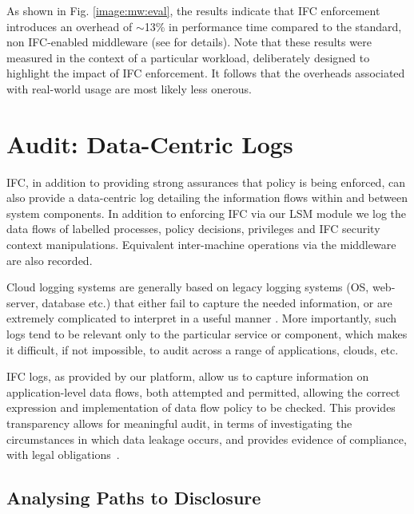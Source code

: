 \documentclass[10pt,journal,compsoc]{IEEEtran}
\begin{document}
As shown in Fig. \ref{image:mw:eval},
the results indicate that IFC enforcement introduces an overhead of  $\sim$13\% in performance time compared to the standard, non IFC-enabled middleware (see \cite{singh2014ic2e} for details).
Note that these results were measured in the context of a particular workload, deliberately designed to highlight the impact of IFC enforcement. It follows that the overheads associated with real-world usage are most likely less onerous. 





 
\section{Audit: Data-Centric Logs}
\label{sec:audit}




IFC, in addition to providing strong assurances that policy is being enforced, can also provide a data-centric log \cite{Ganjali:2012:ACM:2382536.2382549} detailing the information flows within and between system components. 
In addition to enforcing IFC via our LSM module we log the data flows of labelled processes, policy decisions, privileges and IFC security context manipulations.
Equivalent inter-machine operations via the middleware are also recorded.


Cloud logging systems are generally based on legacy logging systems (OS, web-server, database etc.) that either fail to capture the needed information, or are extremely complicated to interpret in a useful manner \cite{ko2011system}. More importantly, such logs tend to be relevant only to the particular service or component, which makes it difficult, if not impossible, to audit across a range of applications, clouds, etc.

IFC logs, as provided by our platform, allow us to capture information on application-level data flows, both attempted and permitted, allowing the correct expression and implementation of data flow policy to be checked. This provides transparency allows for meaningful audit, in terms of investigating the circumstances in which data leakage occurs, and provides evidence of compliance, \eg with legal obligations~\cite{singh2015:claw-magazine}. 




\subsection{Analysing Paths to Disclosure}
\end{document}
